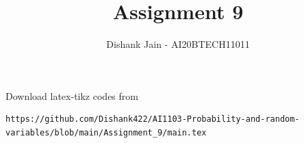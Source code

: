 \documentclass[journal,12pt,twocolumn]{IEEEtran}
\DeclareMathOperator*{\Res}{Res}
\begin{document}
\newcommand{\BEQA}{\begin{eqnarray}}
\newcommand{\EEQA}{\end{eqnarray}}
\newcommand{\define}{\stackrel{\triangle}{=}}

\raggedbottom
\setlength{\parindent}{0pt}
\providecommand{\mbf}{\mathbf}
\providecommand{\pr}[1]{\ensuremath{\Pr\left(#1\right)}}
\providecommand{\qfunc}[1]{\ensuremath{Q\left(#1\right)}}
\providecommand{\sbrak}[1]{\ensuremath{{}\left[#1\right]}}
\providecommand{\lsbrak}[1]{\ensuremath{{}\left[#1\right.}}
\providecommand{\rsbrak}[1]{\ensuremath{{}\left.#1\right]}}
\providecommand{\brak}[1]{\ensuremath{\left(#1\right)}}
\providecommand{\lbrak}[1]{\ensuremath{\left(#1\right.}}
\providecommand{\rbrak}[1]{\ensuremath{\left.#1\right)}}
\providecommand{\cbrak}[1]{\ensuremath{\left\{#1\right\}}}
\providecommand{\lcbrak}[1]{\ensuremath{\left\{#1\right.}}
\providecommand{\rcbrak}[1]{\ensuremath{\left.#1\right\}}}
\theoremstyle{remark}
\newtheorem{rem}{Remark}
\newcommand{\sgn}{\mathop{\mathrm{sgn}}}
\providecommand{\abs}[1]{\vert#1\vert}
\providecommand{\res}[1]{\Res\displaylimits_{#1}} 
\providecommand{\norm}[1]{\lVert#1\rVert}
\providecommand{\mtx}[1]{\mathbf{#1}}
\providecommand{\mean}[1]{E[ #1 ]}
\providecommand{\fourier}{\overset{\mathcal{F}}{ \rightleftharpoons}}
\providecommand{\system}{\overset{\mathcal{H}}{ \longleftrightarrow}}
\newcommand{\solution}{\noindent \textbf{Solution: }}
\newcommand{\cosec}{\,\text{cosec}\,}
\providecommand{\dec}[2]{\ensuremath{\overset{#1}{\underset{#2}{\gtrless}}}}
\newcommand{\myvec}[1]{\ensuremath{\begin{pmatrix}#1\end{pmatrix}}}
\newcommand{\mydet}[1]{\ensuremath{\begin{vmatrix}#1\end{vmatrix}}}
\makeatletter
{}
\makeatother
\let\StandardTheFigure\thefigure
\let\vec\mathbf
\renewcommand{\thefigure}{\theproblem}
\def\putbox#1#2#3{\makebox[0in][l]{\makebox[#1][l]{}\raisebox{\baselineskip}[0in][0in]{\raisebox{#2}[0in][0in]{#3}}}}
     \def\rightbox#1{\makebox[0in][r]{#1}}
     \def\centbox#1{\makebox[0in]{#1}}
     \def\topbox#1{\raisebox{-\baselineskip}[0in][0in]{#1}}
     \def\midbox#1{\raisebox{-0.5\baselineskip}[0in][0in]{#1}}
\vspace{3cm}
\title{Assignment 9}
\author{Dishank Jain - AI20BTECH11011}
\maketitle
\newpage
\bigskip
\renewcommand{\thefigure}{\theenumi}
\renewcommand{\thetable}{\theenumi}
Download latex-tikz codes from 
%
\begin{lstlisting}
https://github.com/Dishank422/AI1103-Probability-and-random-variables/blob/main/Assignment_9/main.tex
\end{lstlisting}
\end{document}
